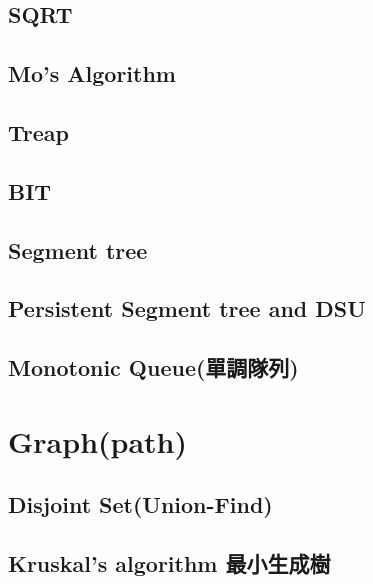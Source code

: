 \subsection{SQRT}


\clearpage

\subsection{Mo's Algorithm}


\subsection{Treap}


\subsection{BIT}


\subsection{Segment tree}


\clearpage

\subsection{Persistent Segment tree and DSU}


\subsection{Monotonic Queue(單調隊列)}


\section{Graph(path)}

\subsection{Disjoint Set(Union-Find)}


\subsection{Kruskal’s algorithm 最小生成樹}


